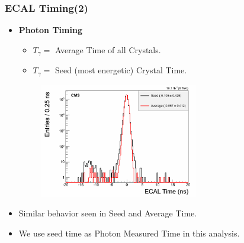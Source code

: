 \documentclass{beamer}
\begin{document}
\begin{frame}
\frametitle{\huge{ECAL Timing(2)}}
  \begin{minipage}[b]{0.8\paperwidth}
   \begin{itemize}
    \item \textcolor{UMN@Maroon}{\textbf{Photon Timing}}
        \begin{itemize}
         \item $T_{\gamma} =$ Average Time of all Crystals.
         \item $T_{\gamma} =$ Seed (most energetic) Crystal Time.
        \end{itemize}
      
       \includegraphics[height=5.0cm,width=0.70\textwidth]            {THESISPLOTS/AverageVsSeedTime_ECAL.png}   
  \end{itemize}
  \begin{itemize}
   \item  Similar behavior seen in Seed and Average Time.
   \item  We use seed time as Photon Measured Time in this analysis.
  \end{itemize}
  
 \end{minipage}
\end{frame}
\end{document}
